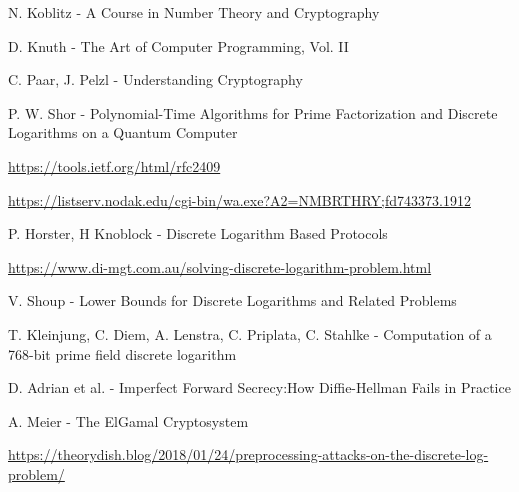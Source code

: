 \clearpage
\begin{thebibliography}{}
	\footnotesize
	
	N. Koblitz - A Course in Number Theory and Cryptography
	
	D. Knuth - The Art of Computer Programming, Vol. II
	
	C. Paar, J. Pelzl - Understanding Cryptography
	
	P. W. Shor - Polynomial-Time Algorithms for Prime Factorization and Discrete Logarithms on a Quantum Computer
	
	\href{https://tools.ietf.org/html/rfc2409}{https://tools.ietf.org/html/rfc2409}
	
	\href{https://listserv.nodak.edu/cgi-bin/wa.exe?A2=NMBRTHRY;fd743373.1912}{https://listserv.nodak.edu/cgi-bin/wa.exe?A2=NMBRTHRY;fd743373.1912}
	
	P. Horster, H Knoblock - Discrete Logarithm Based Protocols
	
	\href{https://www.di-mgt.com.au/solving-discrete-logarithm-problem.html}{https://www.di-mgt.com.au/solving-discrete-logarithm-problem.html}
	
	V. Shoup - Lower Bounds for Discrete Logarithms and Related Problems
	
	T. Kleinjung, C. Diem, A. Lenstra, C. Priplata, C. Stahlke - Computation of a 768-bit prime field discrete logarithm
	
	D. Adrian et al. - Imperfect Forward Secrecy:How Diffie-Hellman Fails in Practice
	
	A. Meier - The ElGamal Cryptosystem
	
	\href{https://theorydish.blog/2018/01/24/preprocessing-attacks-on-the-discrete-log-problem/}{https://theorydish.blog/2018/01/24/preprocessing-attacks-on-the-discrete-log-problem/}
		
\end{thebibliography}
